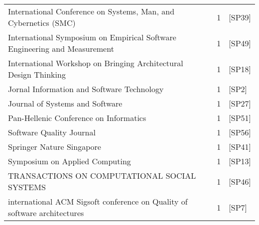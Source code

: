 \begin{tabular}{lrl}
                                  International Conference on Systems, Man, and Cybernetics (SMC) &      1 &                                     [SP39] \\
                        International Symposium on Empirical Software Engineering and Measurement &      1 &                                     [SP49] \\
                                 International Workshop on Bringing Architectural Design Thinking &      1 &                                     [SP18] \\
                                                       Jornal Information and Software Technology &      1 &                                      [SP2] \\
                                                                  Journal of Systems and Software &      1 &                                     [SP27] \\
                                                           Pan-Hellenic Conference on Informatics &      1 &                                     [SP51] \\
                                                                         Software Quality Journal &      1 &                                     [SP56] \\
                                                                        Springer Nature Singapore &      1 &                                     [SP41] \\
                                                                   Symposium on Applied Computing &      1 &                                     [SP13] \\
                                                     TRANSACTIONS ON COMPUTATIONAL SOCIAL SYSTEMS &      1 &                                     [SP46] \\
                        international ACM Sigsoft conference on Quality of software architectures &      1 &                                      [SP7] \\
\bottomrule
\end{tabular}
